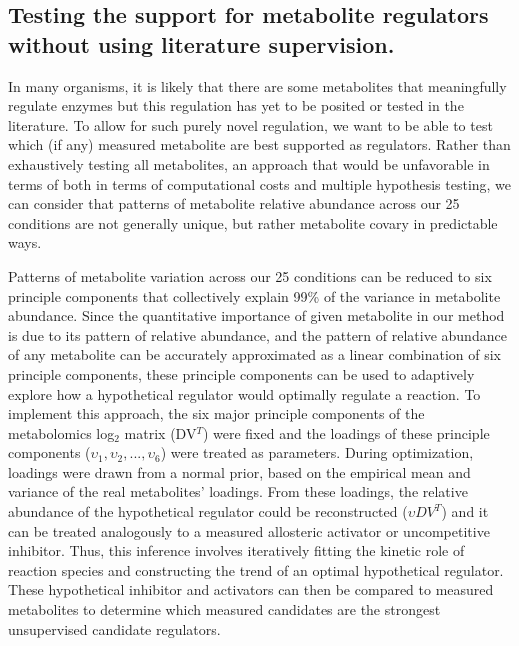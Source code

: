 \documentclass[12pt]{nature}\usepackage{graphicx, color}
\begin{document}
\subsection{Testing the support for metabolite regulators without using literature supervision.}

In many organisms, it is likely that there are some metabolites that meaningfully regulate enzymes but this regulation has yet to be posited or tested in the literature.  To allow for such purely novel regulation, we want to be able to test which (if any) measured metabolite are best supported as regulators.  Rather than exhaustively testing all metabolites, an approach that would be unfavorable in terms of both in terms of computational costs and multiple hypothesis testing, we can consider that patterns of metabolite relative abundance across our 25 conditions are not generally unique, but rather metabolite covary in predictable ways.  

Patterns of metabolite variation across our 25 conditions can be reduced to six principle components that collectively explain 99\% of the variance in metabolite abundance.  Since the quantitative importance of given metabolite in our method is due to its pattern of relative abundance, and the pattern of relative abundance of any metabolite can be accurately approximated as a linear combination of six principle components, these principle components can be used to adaptively explore how a hypothetical regulator would optimally regulate a reaction.  To implement this approach, the six major principle components of the metabolomics log$_{2}$ matrix (DV$^{T}$) were fixed and the loadings of these principle components ($\upsilon_{1}, \upsilon_{2}, ..., \upsilon_{6}$) were treated as parameters.  During optimization, loadings were drawn from a normal prior, based on the empirical mean and variance of the real metabolites' loadings.  From these loadings, the relative abundance of the hypothetical regulator could be reconstructed ($\upsilon DV^{T}$) and it can be treated analogously to a measured allosteric activator or uncompetitive inhibitor.  Thus, this inference involves iteratively fitting the kinetic role of reaction species and constructing the trend of an optimal hypothetical regulator.  These hypothetical inhibitor and activators can then be compared to measured metabolites to determine which measured candidates are the strongest unsupervised candidate regulators.
\end{document}
